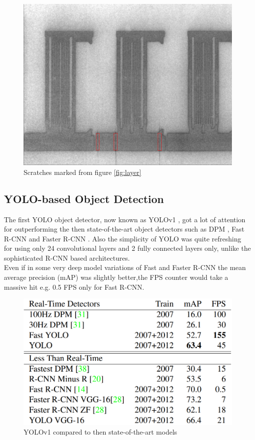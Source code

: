 \begin{figure}[ht]
  \includegraphics[width=\textwidth]{images/layer_00325_marked_cropped}
  \centering
  \caption{Scratches marked from figure \ref{fig:layer}}
  \label{fig:layer_00325_marked_cropped}
\end{figure}


\subsection{YOLO-based Object Detection}
The first YOLO object detector, now known as YOLOv1 \cite{yolov1_paper}, got a lot of attention for outperforming the then state-of-the-art object detectors such as DPM \cite{dpm_paper}, Fast R-CNN \cite{fast_rcnn_paper} and Faster R-CNN \cite{faster_rcnn_paper}. Also the simplicity of YOLO was quite refreshing for using only 24 convolutional layers and 2 fully connected layers only, unlike the sophisticated R-CNN based architectures. \\
Even if in some very deep model variations of Fast and Faster R-CNN the mean average precision (mAP) was slightly better,the FPS counter would take a massive hit e.g. 0.5 FPS only for Fast R-CNN. \\

\begin{figure}[!h]
  \centering
  \includegraphics[width=0.75\linewidth]{images/yolo_images/compare_yolov1}
  \caption{YOLOv1 compared to then state-of-the-art models \cite{yolov1_paper}}
\end{figure}


